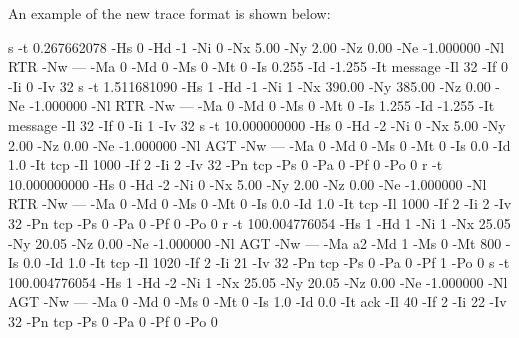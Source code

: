 An example of the new trace format is shown below:
\begin{program}
s -t 0.267662078 -Hs 0 -Hd -1 -Ni 0 -Nx 5.00 -Ny 2.00 -Nz 0.00 -Ne
-1.000000 -Nl RTR -Nw --- -Ma 0 -Md 0 -Ms 0 -Mt 0 -Is 0.255 -Id -1.255 -It
message -Il 32 -If 0 -Ii 0 -Iv 32
s -t 1.511681090 -Hs 1 -Hd -1 -Ni 1 -Nx 390.00 -Ny 385.00 -Nz 0.00 -Ne
-1.000000 -Nl RTR -Nw --- -Ma 0 -Md 0 -Ms 0 -Mt 0 -Is 1.255 -Id -1.255 -It
message -Il 32 -If 0 -Ii 1 -Iv 32
s -t 10.000000000 -Hs 0 -Hd -2 -Ni 0 -Nx 5.00 -Ny 2.00 -Nz 0.00 -Ne
-1.000000 -Nl AGT -Nw --- -Ma 0 -Md 0 -Ms 0 -Mt 0 -Is 0.0 -Id 1.0 -It tcp -Il 1000 -If
2 -Ii 2 -Iv 32 -Pn tcp -Ps 0 -Pa 0 -Pf 0 -Po 0
r -t 10.000000000 -Hs 0 -Hd -2 -Ni 0 -Nx 5.00 -Ny 2.00 -Nz 0.00 -Ne
-1.000000 -Nl RTR -Nw --- -Ma 0 -Md 0 -Ms 0 -Mt 0 -Is 0.0 -Id 1.0 -It tcp -Il 1000 -If
2 -Ii 2 -Iv 32 -Pn tcp -Ps 0 -Pa 0 -Pf 0 -Po 0
r -t 100.004776054 -Hs 1 -Hd 1 -Ni 1 -Nx 25.05 -Ny 20.05 -Nz 0.00 -Ne
-1.000000 -Nl AGT -Nw --- -Ma a2 -Md 1 -Ms 0 -Mt 800 -Is 0.0 -Id 1.0 -It
tcp -Il 1020 -If 2 -Ii 21 -Iv 32 -Pn tcp -Ps 0 -Pa 0 -Pf 1 -Po 0
s -t 100.004776054 -Hs 1 -Hd -2 -Ni 1 -Nx 25.05 -Ny 20.05 -Nz 0.00 -Ne
-1.000000 -Nl AGT -Nw --- -Ma 0 -Md 0 -Ms 0 -Mt 0 -Is 1.0 -Id 0.0 -It ack -Il 40
-If 2 -Ii 22 -Iv 32 -Pn tcp -Ps 0 -Pa 0 -Pf 0 -Po 0 
\end{program}

